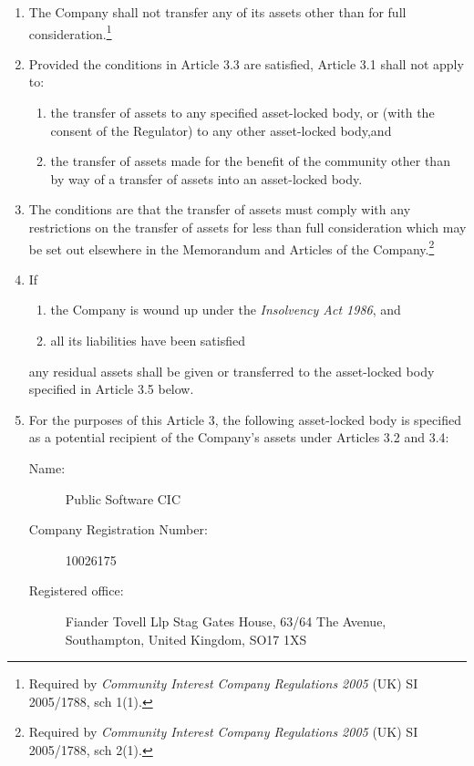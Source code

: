 \documentclass[a4paper,12pt]{article}
\renewcommand{\labelenumii}{(\alph{enumii})}
\begin{document}
\begin{enumerate}
  \item The Company shall not transfer any of its assets other than for full consideration.\footnote{\label{assetlock1}Required by \textit{Community Interest Company Regulations 2005} (UK) SI 2005/1788, sch 1(1).}
  \item Provided the conditions in Article 3.3 are satisfied, Article 3.1 shall not apply to:
  \begin{enumerate}
    \renewcommand{\labelenumii}{(
    \alph{enumii})}
    \item the transfer of assets to any specified asset-locked body, or (with the consent of the Regulator) to any other asset-locked body,\footnotemark[\ref{assetlock1}] and
    \item the transfer of assets made for the benefit of the community other than by way of a transfer of assets into an asset-locked body.\footnotemark[\ref{assetlock1}]
  \end{enumerate}
  \item The conditions are that the transfer of assets must comply with any restrictions on the transfer of assets for less than full consideration which may be set out elsewhere in the Memorandum and Articles of the Company.\footnote{Required by \textit{Community Interest Company Regulations 2005} (UK) SI 2005/1788, sch 2(1).}
  \item If
  \begin{enumerate}
    \item the Company is wound up under the \textit{Insolvency Act 1986}, and
    \item all its liabilities have been satisfied
  \end{enumerate}
  any residual assets shall be given or transferred to the asset-locked body specified in Article 3.5 below.
  \item For the purposes of this Article 3, the following asset-locked body is specified as a potential recipient of the Company's assets under Articles 3.2 and 3.4:
  \begin{description}
    \item[Name:] Public Software CIC
    \item[Company Registration Number:] 10026175
    \item[Registered office:] Fiander Tovell Llp Stag Gates House, 63/64 The Avenue, Southampton, United Kingdom, SO17 1XS
  \end{description}
\end{enumerate}
\end{document}
